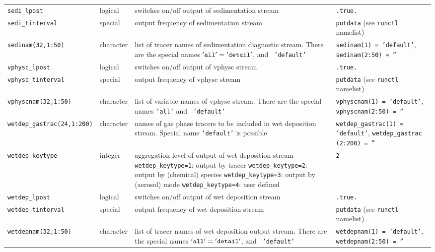\begin{longtable}{l@{\extracolsep\fill}lp{5.0cm}p{3.0cm}}
{\tt sedi\_lpost}\index{namelist variables!sedi\_lpost}
 & logical & switches on/off output of sedimentation stream
  & {\tt .true.} \\
{\tt sedi\_tinterval}\index{namelist variables!sedi\_interval}
 & special & output frequency of sedimentation stream
  & {\tt putdata} (see {\tt runctl} namelist) \\
{\tt sedinam(32,1:50)}\index{namelist variables!sedinam}
 & character & list of tracer names of
  sedimentation diagnostic stream. There are the special names ${\tt 'all'}=
  {\tt 'detail'}$,  and {\tt 
  'default'}
  & {\tt sedinam(1) = 'default'}, {\tt sedinam(2:50) = ''}\\
{\tt vphysc\_lpost}\index{namelist variables!vphysc\_lpost}
 & logical & switches on/off output of vphysc stream
  & {\tt .true.} \\
{\tt vphysc\_tinterval}\index{namelist variables!vphysc\_tinterval}
 & special & output frequency of vphysc stream
  & {\tt putdata} (see {\tt runctl} namelist) \\
{\tt vphyscnam(32,1:50)}\index{namelist variables!vphyscnam}
 & character & list of variable names of
  vphysc stream. There are the special names {\tt 'all'} and {\tt
  'default'}
  & {\tt vphyscnam(1) = 'default'}, {\tt vphyscnam(2:50) = ''}\\
{\tt wetdep\_gastrac(24,1:200)}
\index{namelist variables!wetdep\_gastrac}
 & character & names of gas phase
  tracers to be included in
  wet deposition stream. Special name {\tt 'default'} is possible 
  & {\tt wetdep\_gastrac(1) = 'default'}, {\tt wetdep\_gastrac (2:200) = ''}\\
{\tt wetdep\_keytype}\index{namelist variables!wetdep\_keytype}
 & integer & aggregation level of
  output of wet deposition stream \newline
  {\tt wetdep\_keytype=1}: output by tracer\newline
  {\tt wetdep\_keytype=2}: output by (chemical) species\newline
  {\tt wetdep\_keytype=3}: output by (aerosol) mode\newline
  {\tt wetdep\_keytype=4}: user defined
  & {\tt 2}\\
{\tt wetdep\_lpost}\index{namelist variables!wetdep\_lpost}
 & logical & switches on/off output of wet deposition stream
  & {\tt .true.} \\
{\tt wetdep\_tinterval}\index{namelist variables!wetdep\_tinterval}
 & special & output frequency of wet deposition stream
  & {\tt putdata} (see {\tt runctl} namelist) \\
{\tt wetdepnam(32,1:50)}\index{namelist variables!wetdepnam}
 & character & list of tracer names of
wet deposition output stream. There are the special names ${\tt 'all'}={\tt
  'detail'}$,  and {\tt
  'default'}
  & {\tt wetdepnam(1) = 'default'}, {\tt wetdepnam(2:50) = ''}\\
\hline
\end{longtable}



